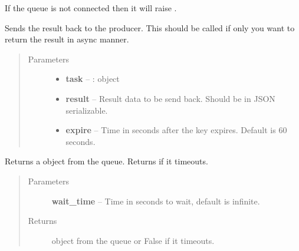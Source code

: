 \documentclass[letterpaper,10pt,english]{sphinxmanual}
\begin{document}
\begin{fulllineitems}
\begin{fulllineitems}
If the queue is not connected then it will raise
{\hyperref[api:retask.ConnectionError]{}}.

\end{fulllineitems}


\begin{fulllineitems}
\label{retask.queue:retask.queue.Queue.send}
Sends the result back to the producer. This should be called if only you
want to return the result in async manner.
\begin{quote}\begin{description}
\item[{Parameters}] \leavevmode\begin{itemize}
\item {} 
\textbf{task} -- : object

\item {} 
\textbf{result} -- Result data to be send back. Should be in JSON serializable.

\item {} 
\textbf{expire} -- Time in seconds after the key expires. Default is 60 seconds.

\end{itemize}

\end{description}\end{quote}

\end{fulllineitems}


\begin{fulllineitems}
\label{retask.queue:retask.queue.Queue.wait}
Returns a  object from the queue. Returns  if it timeouts.
\begin{quote}\begin{description}
\item[{Parameters}] \leavevmode
\textbf{wait\_time} -- Time in seconds to wait, default is infinite.

\item[{Returns}] \leavevmode
{} object from the queue or False if it timeouts.

\end{description}\end{quote}


\end{fulllineitems}
\end{fulllineitems}
\end{document}
